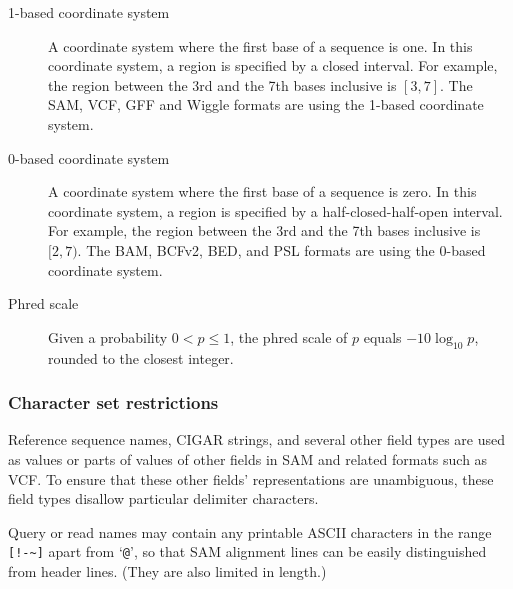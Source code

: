 \documentclass[10pt]{article}
\begin{document}
\begin{description}
\item[1-based coordinate system] A coordinate system where the first
  base of a sequence is one. In this coordinate system, a region is
  specified by a closed interval. For example, the region between the
  3rd and the 7th bases inclusive is $[3,7]$. The SAM, VCF, GFF and Wiggle
  formats are using the 1-based coordinate system.

\item[0-based coordinate system] A coordinate system where the first
  base of a sequence is zero. In this coordinate system, a region is
  specified by a half-closed-half-open interval. For example, the region
  between the 3rd and the 7th bases inclusive is $[2,7)$. The BAM, BCFv2, BED,
  and PSL formats are using the 0-based coordinate system.

\item[Phred scale] Given a probability $0<p\le 1$, the phred scale of $p$
  equals $-10\log_{10}p$, rounded to the closest integer.

\end{description}


\subsubsection{Character set restrictions}\label{sec:charset}

Reference sequence names, CIGAR strings, and several other field types are used as values or parts of values of other fields in SAM and related formats such as VCF.
To ensure that these other fields' representations are unambiguous, these field types disallow particular delimiter characters.

Query or read names may contain any printable ASCII characters in the range \verb"[!-~]" apart from `\verb"@"', so that SAM alignment lines can be easily distinguished from header lines.
(They are also limited in length.)
\end{document}
